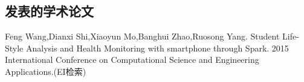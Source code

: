 \begin{resume}

  \section*{发表的学术论文} %
  \begin{enumerate}[{[}1{]}]
  \addtolength{\itemsep}{-.36\baselineskip}%
  \item Feng Wang,Dianxi Shi,Xiaoyun Mo,Banghui Zhao,Ruosong Yang. Student Life-Style Analysis and Health Monitoring with smartphone through Spark. 2015 International Conference on Computational Science and Engineering Applications.(EI检索)
 
  \end{enumerate}
\end{resume}
